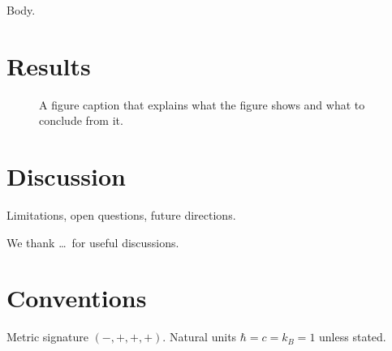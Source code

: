 \documentclass[
  aps,           %
  prd,           %
  reprint,       %
  superscriptaddress,
  nofootinbib,
  amsmath,
  amssymb,
  floatfix,
]{revtex4-2}
\begin{document}
Body.

\section{Results}
\label{sec:results}

\begin{figure}[t]
  \centering
  \caption{A figure caption that explains what the figure shows and what to
  conclude from it.}
  \label{fig:example}
\end{figure}

\section{Discussion}
\label{sec:discussion}

Limitations, open questions, future directions.

\begin{acknowledgments}
We thank \dots\ for useful discussions.
\end{acknowledgments}

\printbibliography

\appendix

\section{Conventions}
\label{app:conventions}

Metric signature $(-,+,+,+)$. Natural units $\hbar = c = k_B = 1$ unless stated.
\end{document}
